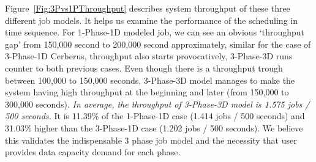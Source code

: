 Figure~\ref{Fig:3Pvs1PThroughput} describes system throughput of these three different job models.
It helps us examine the performance of the scheduling in time sequence.
For 1-Phase-1D modeled job, we can see an obvious `throughput gap'
from 150,000 second to 200,000 second approximately,
similar for the case of 3-Phase-1D Cerberus, throughput also starts provocatively,
3-Phase-3D runs counter to both previous cases.
Even though there is a throughput trough between 100,000 to 150,000 seconds,
3-Phase-3D model manages to make the system having high throughput at the beginning and
later (from 150,000 to 300,000 seconds).
\textit{In average, the throughput of 3-Phase-3D model is 1.575 jobs / 500 seconds.}
It is 11.39\% of the 1-Phase-1D case (1.414 jobs / 500 seconds) and
31.03\% higher than the 3-Phase-1D case (1.202 jobs / 500 seconds).
We believe this validates the indispensable 3 phase job model and
the necessity that user provides data capacity demand for each phase.



